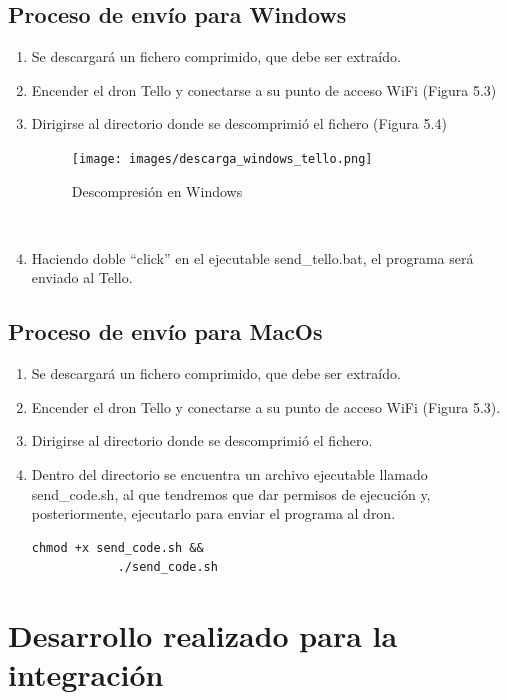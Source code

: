 \documentclass{report}
\begin{document}
\subsection{Proceso de envío para Windows}

\begin{enumerate}
	\item Se descargará un fichero comprimido, que debe ser extraído.
	\item Encender el dron Tello y conectarse a su punto de acceso WiFi (Figura 5.3)
	\item Dirigirse al directorio donde se descomprimió el fichero (Figura 5.4)
	\\
		\begin{figure}[h!]
 			 \centering
    			\texttt{[image: images/descarga\_windows\_tello.png]}
  			\caption{Descompresión en Windows}
  			\label{Descompresión en Windows}
		\end{figure}
	\\
	\item Haciendo doble “click” en el ejecutable send\_tello.bat, el programa será enviado al Tello.
\end{enumerate}

\subsection{Proceso de envío para MacOs}

\begin{enumerate}
	\item Se descargará un fichero comprimido, que debe ser extraído.
	\item Encender el dron Tello y conectarse a su punto de acceso WiFi (Figura 5.3).
	\item Dirigirse al directorio donde se descomprimió el fichero.
	\item Dentro del directorio se encuentra un archivo ejecutable llamado send\_code.sh, al que tendremos que dar permisos de ejecución y, posteriormente, ejecutarlo para enviar el programa al dron.
	\\
		\begin{lstlisting}[frame=single,breaklines=true, label=Comandos para ejecución del envío en MacOs, caption=Comandos para ejecución del envío en MacOs,  captionpos=b]
			chmod +x send_code.sh &&
			./send_code.sh
		\end{lstlisting}
\end{enumerate}

\section{Desarrollo realizado para la integración}
\end{document}
